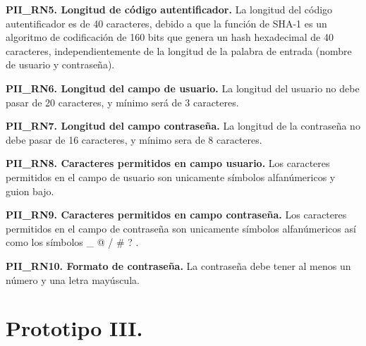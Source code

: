 \documentclass[12pt, a4paper, titlepage]{report}
\begin{document}
			\textbf{PII\_RN5. Longitud de código autentificador.} La longitud del código autentificador es de 40 caracteres, debido a que la función de SHA-1 es un algoritmo de codificación de 160 bits que genera un hash hexadecimal de 40 caracteres, independientemente de la longitud de la palabra de entrada (nombre de usuario y contraseña).\\
			\label{PII_RN5}
			
			\textbf{PII\_RN6. Longitud del campo de usuario.} La longitud del usuario no debe pasar de 20 caracteres, y mínimo será de 3 caracteres.\\
			\label{PII_RN6}
			
			\textbf{PII\_RN7. Longitud del campo contraseña.}
			La longitud de la contraseña no debe pasar de 16 caracteres, y mínimo sera de 8 caracteres.\\
			\label{PII_RN7}
			
			\textbf{PII\_RN8. Caracteres permitidos en campo usuario.} Los caracteres permitidos en el campo de usuario son unicamente símbolos alfanúmericos y guion bajo.\\
			\label{PII_RN8}
			
			\textbf{PII\_RN9. Caracteres permitidos en campo contraseña.} Los caracteres permitidos en el campo de contraseña son unicamente símbolos alfanúmericos así como los s\'imbolos \_ @ / \# ? .\\
			\label{PII_RN9}
			
			\textbf{PII\_RN10. Formato de contraseña.} La contraseña debe tener al menos un número y una letra mayúscula.\\
			\label{PII_RN10}
				
	
	    \section{Prototipo III.}
\end{document}
